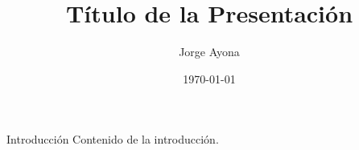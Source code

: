 \documentclass{beamer}
\title{Título de la Presentación}
\author{Jorge Ayona}
\date{\today}
\begin{document}
\frame{\titlepage}

\begin{frame}{Introducción}
Contenido de la introducción.
\end{frame}
\end{document}
